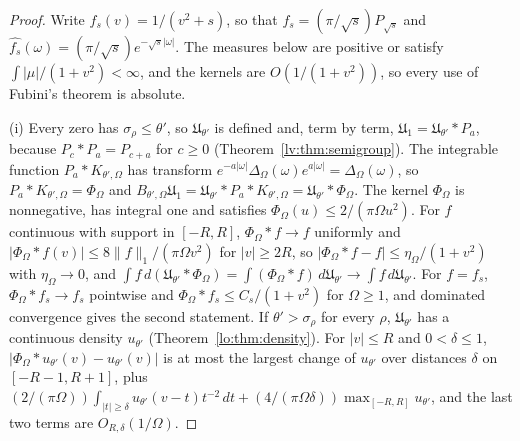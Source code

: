 \begin{proof}
Write $f_s(v)=1/(v^2+s)$, so that $f_s=(\pi/\sqrt s)P_{\sqrt s}$ and $\widehat{f_s}(\omega)=(\pi/\sqrt s)e^{-\sqrt s|\omega|}$. The measures below are positive or satisfy $\int|\mu|/(1+v^2)<\infty$, and the kernels are $O(1/(1+v^2))$, so every use of Fubini's theorem is absolute.

(i) Every zero has $\sigma_\rho\le\theta'$, so $\mathfrak U_{\theta'}$ is defined and, term by term, $\mathfrak U_1=\mathfrak U_{\theta'}*P_a$, because $P_c*P_a=P_{c+a}$ for $c\ge0$ (Theorem~\ref{lv:thm:semigroup}). The integrable function $P_a*K_{\theta',\Omega}$ has transform $e^{-a|\omega|}\Delta_\Omega(\omega)e^{a|\omega|}=\Delta_\Omega(\omega)$, so $P_a*K_{\theta',\Omega}=\Phi_\Omega$ and $B_{\theta',\Omega}\mathfrak U_1=\mathfrak U_{\theta'}*P_a*K_{\theta',\Omega}=\mathfrak U_{\theta'}*\Phi_\Omega$. The kernel $\Phi_\Omega$ is nonnegative, has integral one and satisfies $\Phi_\Omega(u)\le2/(\pi\Omega u^2)$. For $f$ continuous with support in $[-R,R]$, $\Phi_\Omega*f\to f$ uniformly and $|\Phi_\Omega*f(v)|\le8\|f\|_1/(\pi\Omega v^2)$ for $|v|\ge2R$, so $|\Phi_\Omega*f-f|\le\eta_\Omega/(1+v^2)$ with $\eta_\Omega\to0$, and $\int f\,d(\mathfrak U_{\theta'}*\Phi_\Omega)=\int(\Phi_\Omega*f)\,d\mathfrak U_{\theta'}\to\int f\,d\mathfrak U_{\theta'}$. For $f=f_s$, $\Phi_\Omega*f_s\to f_s$ pointwise and $\Phi_\Omega*f_s\le C_s/(1+v^2)$ for $\Omega\ge1$, and dominated convergence gives the second statement. If $\theta'>\sigma_\rho$ for every $\rho$, $\mathfrak U_{\theta'}$ has a continuous density $u_{\theta'}$ (Theorem~\ref{lo:thm:density}). For $|v|\le R$ and $0<\delta\le1$, $|\Phi_\Omega*u_{\theta'}(v)-u_{\theta'}(v)|$ is at most the largest change of $u_{\theta'}$ over distances $\delta$ on $[-R-1,R+1]$, plus $(2/(\pi\Omega))\int_{|t|\ge\delta}u_{\theta'}(v-t)t^{-2}\,dt+(4/(\pi\Omega\delta))\max_{[-R,R]}u_{\theta'}$, and the last two terms are $O_{R,\delta}(1/\Omega)$.


\end{proof}
